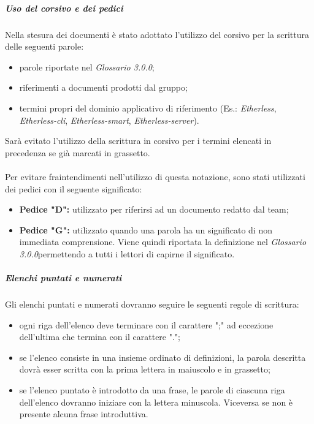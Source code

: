   \subparagraph*{Uso del corsivo e dei pedici}
  Nella stesura dei documenti è stato adottato l'utilizzo del corsivo per la scrittura delle seguenti parole:
  \begin{itemize}
  	\item parole riportate nel \textit{Glossario 3.0.0\docs};
  	\item riferimenti a documenti prodotti dal gruppo;
  	\item termini propri del dominio applicativo di riferimento (Es.: \textit{Etherless}, \textit{Etherless-cli}, \textit{Etherless-smart}, \textit{Etherless-server}).
  \end{itemize}
  Sarà evitato l'utilizzo della scrittura in corsivo per i termini elencati in precedenza se già marcati in grassetto.\\\\
  Per evitare fraintendimenti nell'utilizzo di questa notazione, sono stati utilizzati dei pedici con il seguente significato:
    \begin{itemize}
      \item \textbf{Pedice "D":} utilizzato per riferirsi ad un documento redatto dal team;
      \item \textbf{Pedice "G":} utilizzato quando una parola ha un significato
      di non immediata comprensione. Viene quindi riportata la definizione nel
      \textit{Glossario 3.0.0}\doc permettendo a tutti i lettori di capirne il significato.
    \end{itemize}

  \subparagraph*{Elenchi puntati e numerati}
  Gli elenchi puntati e numerati dovranno seguire le seguenti regole di scrittura:
	\begin{itemize}
		\item ogni riga dell'elenco deve terminare con il carattere ";" ad eccezione dell'ultima che termina con il carattere ".";
		\item se l'elenco consiste in una insieme ordinato di definizioni, la parola descritta dovrà esser scritta con la prima lettera in maiuscolo e in grassetto;
		\item se l'elenco puntato è introdotto da una frase, le parole di ciascuna riga dell'elenco dovranno iniziare con la lettera minuscola. Viceversa se non è presente alcuna frase introduttiva.
	\end{itemize}


